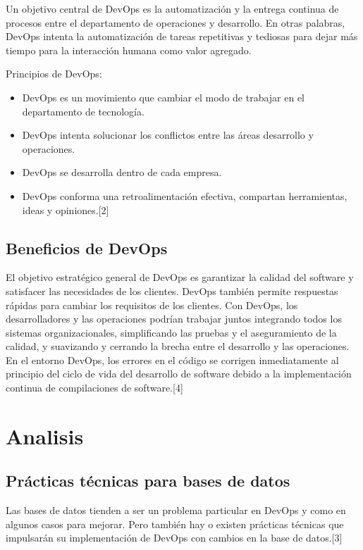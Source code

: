 \documentclass[twoside,twocolumn]{article}
\begin{document}
Un objetivo central de DevOps es la automatización y la entrega continua de procesos entre el departamento de operaciones y desarrollo. En otras palabras, DevOps intenta la automatización de tareas repetitivas y tediosas para dejar más tiempo para la interacción humana como valor agregado.

Principios de DevOps:

\begin{itemize}
\item DevOps es un movimiento que cambiar el modo de trabajar en el departamento de tecnología.
\item DevOps intenta solucionar los conflictos entre las áreas desarrollo y operaciones.
\item DevOps se desarrolla dentro de cada empresa.
\item DevOps conforma una retroalimentación efectiva, compartan herramientas, ideas y opiniones.[2]

\end{itemize}


\subsection{Beneficios de DevOps}

El objetivo estratégico general de DevOps es garantizar la calidad del software y satisfacer las necesidades de los clientes. DevOps también permite respuestas rápidas para cambiar los requisitos de los clientes. Con DevOps, los desarrolladores y las operaciones podrían trabajar juntos integrando todos los sistemas organizacionales, simplificando las pruebas y el aseguramiento de la calidad, y suavizando y cerrando la brecha entre el desarrollo y las operaciones. En el entorno DevOps, los errores en el código se corrigen inmediatamente al principio del ciclo de vida del desarrollo de software debido a la implementación continua de compilaciones de software.[4]




\section{Analisis}

\subsection{Prácticas técnicas para bases de datos}
Las bases de datos tienden a ser un problema particular en DevOps y como en algunos casos para mejorar.
Pero también hay o existen prácticas técnicas que impulsarán su implementación de DevOps con cambios en la base de datos.[3]
\end{document}
